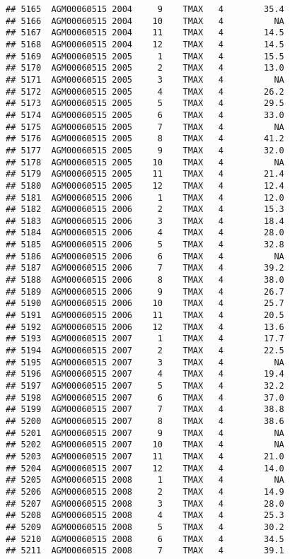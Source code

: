 \documentclass{article}\usepackage[]{graphicx}\usepackage[]{color}
\makeatletter
\newenvironment{kframe}{%
 \def\at@end@of@kframe{}%
 \ifinner\ifhmode%
  \def\at@end@of@kframe{\end{minipage}}%
  \begin{minipage}{\columnwidth}%
 \fi\fi%
 \def\FrameCommand##1{\hskip\@totalleftmargin \hskip-\fboxsep
 \colorbox{shadecolor}{##1}\hskip-\fboxsep
     \hskip-\linewidth \hskip-\@totalleftmargin \hskip\columnwidth}%
 \MakeFramed {\advance\hsize-\width
   \@totalleftmargin\z@ \linewidth\hsize
   \@setminipage}}%
 {\par\unskip\endMakeFramed%
 \at@end@of@kframe}
\newenvironment{knitrout}{}{} %
\makeatother
\begin{document}
\begin{knitrout}
\begin{kframe}
\begin{verbatim}
## 5165  AGM00060515 2004     9    TMAX   4        35.4
## 5166  AGM00060515 2004    10    TMAX   4          NA
## 5167  AGM00060515 2004    11    TMAX   4        14.5
## 5168  AGM00060515 2004    12    TMAX   4        14.5
## 5169  AGM00060515 2005     1    TMAX   4        15.5
## 5170  AGM00060515 2005     2    TMAX   4        13.0
## 5171  AGM00060515 2005     3    TMAX   4          NA
## 5172  AGM00060515 2005     4    TMAX   4        26.2
## 5173  AGM00060515 2005     5    TMAX   4        29.5
## 5174  AGM00060515 2005     6    TMAX   4        33.0
## 5175  AGM00060515 2005     7    TMAX   4          NA
## 5176  AGM00060515 2005     8    TMAX   4        41.2
## 5177  AGM00060515 2005     9    TMAX   4        32.0
## 5178  AGM00060515 2005    10    TMAX   4          NA
## 5179  AGM00060515 2005    11    TMAX   4        21.4
## 5180  AGM00060515 2005    12    TMAX   4        12.4
## 5181  AGM00060515 2006     1    TMAX   4        12.0
## 5182  AGM00060515 2006     2    TMAX   4        15.3
## 5183  AGM00060515 2006     3    TMAX   4        18.4
## 5184  AGM00060515 2006     4    TMAX   4        28.0
## 5185  AGM00060515 2006     5    TMAX   4        32.8
## 5186  AGM00060515 2006     6    TMAX   4          NA
## 5187  AGM00060515 2006     7    TMAX   4        39.2
## 5188  AGM00060515 2006     8    TMAX   4        38.0
## 5189  AGM00060515 2006     9    TMAX   4        26.7
## 5190  AGM00060515 2006    10    TMAX   4        25.7
## 5191  AGM00060515 2006    11    TMAX   4        20.5
## 5192  AGM00060515 2006    12    TMAX   4        13.6
## 5193  AGM00060515 2007     1    TMAX   4        17.7
## 5194  AGM00060515 2007     2    TMAX   4        22.5
## 5195  AGM00060515 2007     3    TMAX   4          NA
## 5196  AGM00060515 2007     4    TMAX   4        19.4
## 5197  AGM00060515 2007     5    TMAX   4        32.2
## 5198  AGM00060515 2007     6    TMAX   4        37.0
## 5199  AGM00060515 2007     7    TMAX   4        38.8
## 5200  AGM00060515 2007     8    TMAX   4        38.6
## 5201  AGM00060515 2007     9    TMAX   4          NA
## 5202  AGM00060515 2007    10    TMAX   4          NA
## 5203  AGM00060515 2007    11    TMAX   4        21.0
## 5204  AGM00060515 2007    12    TMAX   4        14.0
## 5205  AGM00060515 2008     1    TMAX   4          NA
## 5206  AGM00060515 2008     2    TMAX   4        14.9
## 5207  AGM00060515 2008     3    TMAX   4        28.0
## 5208  AGM00060515 2008     4    TMAX   4        25.3
## 5209  AGM00060515 2008     5    TMAX   4        30.2
## 5210  AGM00060515 2008     6    TMAX   4        34.5
## 5211  AGM00060515 2008     7    TMAX   4        39.1

\end{verbatim}
\end{kframe}
\end{knitrout}
\end{document}
